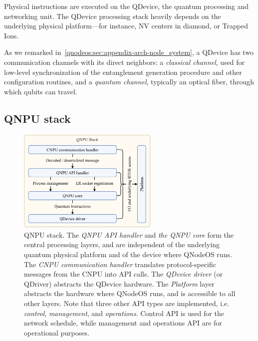 Physical instructions are executed on the \ac{QDevice}, the quantum processing and networking unit. The \ac{QDevice} processing stack heavily depends on the underlying physical platform---for instance, \ac{NV} centers in diamond, or Trapped Ions.

As we remarked in~\cref{qnodeos:sec:appendix-arch-node_system}, a \ac{QDevice} has two communication channels with its direct neighbors: a \emph{classical channel}, used for low-level synchronization of the entanglement generation procedure and other configuration routines, and a \emph{quantum channel}, typically an optical fiber, through which qubits can travel.

\subsection{QNPU stack}
\label{qnodeos:sec:design:qnpu_stack}

\begin{figure}
\begin{center}
\includegraphics[width=0.6\textwidth]{figures/qnodeos/supplementary/qnodeos-stack.pdf}
\end{center}
\caption[]{\ac{QNPU} stack. The \emph{\ac{QNPU} \acs{API} handler} and \emph{the \ac{QNPU} core} form the central processing layers, and are independent of the underlying quantum physical platform and of the device where \ac{QNodeOS} runs. The \emph{\ac{CNPU} communication handler} translates protocol-specific messages from the \ac{CNPU} into \acs{API} calls. The \emph{\ac{QDevice} driver} (or \ac{QDriver}) abstracts the \ac{QDevice} hardware. The \emph{Platform} layer abstracts the hardware where \ac{QNodeOS} runs, and is accessible to all other layers. Note that three other \ac{API} types are implemented, i.e. \emph{control}, \emph{management}, and \emph{operations}. Control \ac{API} is used for the network schedule, while management and operations \ac{API} are for operational purposes. }
\label{qnodeos:fig:qnodeos-stack}
\end{figure}

